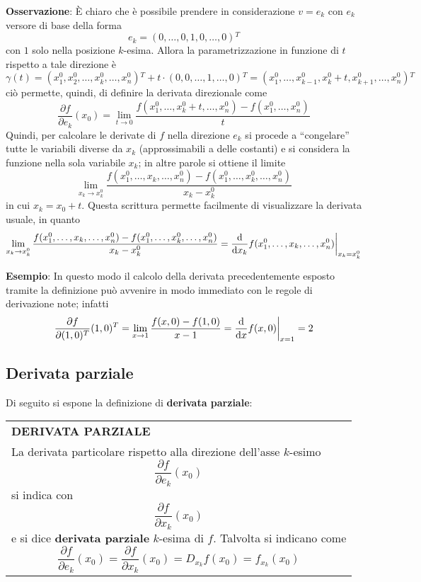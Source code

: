 \documentclass[a4paper]{extarticle}
\newcommand{\quotes}[1]{``#1''}
\renewcommand\arraystretch{}
\newcommand*\dif{\mathop{}\!\mathrm{d}}
\newcommand\restr[2]{{%
  \left.\kern-\nulldelimiterspace %
  #1 %
  \vphantom{\big|} %
  \right|_{#2} %
  }}
\begin{document}
\vspace{1em}
\noindent
\textbf{Osservazione}: È chiaro che è possibile prendere in considerazione $v=e_k$ con $e_k$ versore di base della forma
\[e_k=(0,\dots,0,1,0,\dots,0){^T}\]
con $1$ solo nella posizione $k$-esima. Allora la parametrizzazione in funzione di $t$ rispetto a tale direzione è
\[\gamma(t)=(x_1^0,x_2^0,\dots,x_k^0,\dots,x_n^0){^T} + t \cdot (0,0,\dots,1,\dots,0){^T} = (x_1^0,\dots,x_{k-1}^0,x_k^0+t,x_{k+1}^0,\dots,x_n^0){^T}\]
ciò permette, quindi, di definire la derivata direzionale come
\[\frac{\partial f}{\partial e_k}(x_0) = \lim_{t \to 0} \frac{f(x_1^0,\dots,x_k^0+t,\dots,x_n^0) - f(x_1^0,\dots,x_n^0)}{t}\]
Quindi, per calcolare le derivate di $f$ nella direzione $e_k$ si procede a \quotes{congelare} tutte le variabili diverse da $x_k$ (approssimabili a delle costanti) e si considera la funzione nella sola variabile $x_k$; in altre parole si ottiene il limite
\[\lim_{x_k \to x_k^0} \frac{f(x_1^0,\dots,x_k,\dots,x_n^0) - f(x_1^0,\dots,x_k^0,\dots,x_n^0)}{x_k-x_k^0}\]
in cui $x_k=x_0+t$. Questa scrittura permette facilmente di visualizzare la derivata usuale, in quanto
\[\lim_{x_k \to x_k^0} \frac{f(x_1^0,\dots,x_k,\dots,x_n^0) - f(x_1^0,\dots,x_k^0,\dots,x_n^0)}{x_k-x_k^0} = \restr{\frac{\dif}{\dif x_k} f(x_1^0,\dots,x_k,\dots,x_n^0)}{x_k=x_k^0}\]

\vspace{2em}
\noindent
\textbf{Esempio}: In questo modo il calcolo della derivata precedentemente esposto tramite la definizione può avvenire in modo immediato con le regole di derivazione note; infatti
\[\frac{\partial f}{\partial (1,0){^T}} (1,0){^T} = \lim_{x \to 1} \frac{f(x,0)-f(1,0)}{x-1} = \restr{\frac{\dif}{\dif x} f(x,0)}{x=1} = 2\]

\vspace{1em}
\noindent
\subsection{Derivata parziale}
Di seguito si espone la definizione di \textbf{derivata parziale}:

\vspace{1em}
\setlength{\tabcolsep}{14pt}
\renewcommand{\arraystretch}{2}
\noindent
\begin{tabularx}{\textwidth}{@{}|P|@{}}
    \hline
    {\textbf{DERIVATA PARZIALE}}\\
    \parbox{\linewidth}{La derivata particolare rispetto alla direzione dell'asse $k$-esimo
    \[\frac{\partial f}{\partial e_k}(x_0)\]
    si indica con
    \[\frac{\partial f}{\partial x_k}(x_0)\]
    e si dice \textbf{derivata parziale} $k$-esima di $f$. Talvolta si indicano come
    \[\frac{\partial f}{\partial e_k} (x_0) = \frac{\partial f}{\partial x_k} (x_0) = D_{x_k} f(x_0) = f_{x_k}(x_0)\]
    \vspace{-3mm}}\\
    \hline
\end{tabularx}
\end{document}
